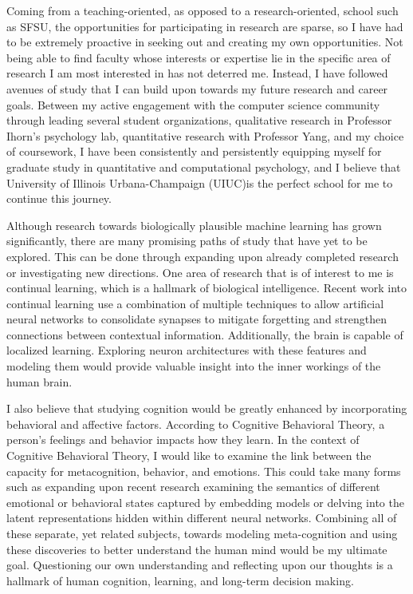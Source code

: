 \documentclass[12pt]{article}
\newcommand{\school}{University of Illinois Urbana-Champaign (UIUC)}
\begin{document}
Coming from a teaching-oriented, as opposed to a research-oriented, school such as SFSU, the opportunities for participating in research are
sparse, so I have had to be extremely proactive in seeking out and creating my own opportunities.  Not being able to find faculty
whose interests or expertise lie in the specific area of research I am most interested in has not deterred me.  Instead, I have followed
avenues of study that I can build upon towards my future research and career goals.  Between my active engagement with the computer science
community through leading several student organizations, qualitative research in Professor Ihorn's psychology lab, quantitative research
with Professor Yang, and my choice of coursework, I have been consistently and persistently equipping myself for graduate study in
quantitative and computational psychology, and I believe that \school is the perfect school for me to continue this journey.

Although research towards biologically plausible machine learning has grown significantly, there are many promising paths of study that
have yet to be explored.  This can be done through expanding upon already completed research or investigating new directions.  One
area of research that is of interest to me is continual learning, which is a hallmark of biological intelligence.  Recent work
into continual learning use a combination of multiple techniques to allow artificial neural networks to consolidate synapses to mitigate
forgetting and strengthen connections between contextual information.  Additionally, the brain is capable of localized learning.
Exploring neuron architectures with these features and modeling them would provide valuable insight into the inner workings of the
human brain.

I also believe that studying cognition would be greatly enhanced by incorporating behavioral and affective factors.  According to
Cognitive Behavioral Theory, a person's feelings and behavior impacts how they learn.  In the context of Cognitive Behavioral Theory, I would
like to examine the link between the capacity for metacognition, behavior, and emotions.  This could take many forms such as expanding upon
recent research examining the semantics of different emotional or behavioral states captured by embedding models or delving into the latent
representations hidden within different neural networks.  Combining all of these separate, yet related subjects, towards modeling
meta-cognition and using these discoveries to better understand the human mind would be my ultimate goal.  Questioning our own understanding
and reflecting upon our thoughts is a hallmark of human cognition, learning, and long-term decision making.
\end{document}
